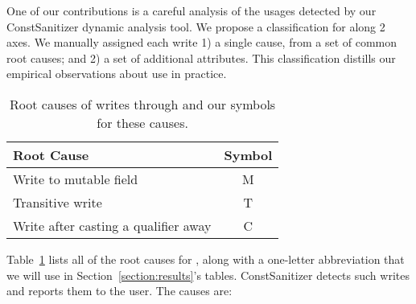 One of our contributions is a careful analysis of the \const{} usages detected
by our ConstSanitizer dynamic analysis tool.
We propose a classification for \wstcqs{} along 2 axes.
We manually assigned each write 1) a single cause, from a set of common root
causes; and 2) a set of additional attributes. This classification distills our
empirical observations about \const{} use in practice.

\begin{table}[ht!]
  \caption{Root causes of writes through \const{} and our symbols for these causes.}
  \label{table:root-cause-reference}
  \centering
  \begin{tabular}{l c}
    \textbf{Root Cause} & \textbf{Symbol} \\
    \midrule
    Write to mutable field         & M \\
    Transitive write               & T \\
    Write after casting a \const{} qualifier away & C \\
  \end{tabular}
\end{table}

\noindent Table~\ref{table:root-cause-reference} lists all of the root causes
for \wstc, along with a one-letter abbreviation that
we will use in Section~\ref{section:results}'s tables.
ConstSanitizer detects such writes and reports them to the user.
The causes are:

